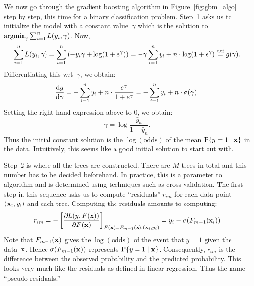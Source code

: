 We now go through the gradient boosting algorithm in Figure~\ref{fig:gbm_algo} 
step by step, this time for a binary classification problem. 
Step~1 asks us to initialize the model with a constant value~$\gamma$ which 
is the solution to $\operatorname{argmin}_{\gamma} \sum_{i = 1}^{n} L(y_i, \gamma)$. Now, 
\begin{equation}
    \sum_{i =1}^{n} L(y_i, \gamma) 
        = \sum_{i = 1}^n \left ( -y_i \gamma + \log (1 + e^{\gamma}) \right )
        = - \gamma \sum_{i = 1}^{n} y_i + n \cdot \log (1 + e^{\gamma}) 
        \stackrel{\text{def}}{=} g(\gamma).
\end{equation}
Differentiating this wrt~$\gamma$, we obtain:
\begin{equation}
    \frac{\mathrm{d} g}{\mathrm{d} \gamma} = - \sum_{i = 1}^n y_i + n \cdot \frac{e^{\gamma}}{1 + e^{\gamma}} 
        = - \sum_{i = 1}^n y_i + n \cdot \sigma(\gamma).  
\end{equation}
Setting the right hand expression above to $0$, we obtain:
\begin{equation}
    \gamma = \log \frac{\bar{y}_n}{1 - \bar{y}_n}.
\end{equation}
Thus the initial constant solution is the $\log (\text{odds})$ of the mean 
$\operatorname{P} \{y = 1 \mid \mathbf{x} \}$ in the data. Intuitively, this seems like a good 
initial solution to start out with.

Step~2 is where all the trees are constructed. There are $M$ trees in total and 
this number has to be decided beforehand. In practice, this is a parameter to 
algorithm and is determined using techniques such as cross-validation. The first 
step in this sequence asks us to compute ``residuals'' $r_{i m}$ for each data 
point $(\mathbf{x}_i, y_i)$ and each tree. Computing the residuals amounts 
to computing:
\begin{equation}
    r_{i m} = - \left [ 
                        \frac{\partial L(y, F(\mathbf{x}))}{\partial F(\mathbf{x})} 
                \right ]_{F(\mathbf{x}) = F_{m - 1}(\mathbf{x}), (\mathbf{x}_i, y_i)}
            = y_i - \sigma(F_{m - 1}(\mathbf{x}_i))
\end{equation}  
Note that $F_{m - 1}(\mathbf{x})$ gives the $\log (\text{odds})$ of the event that 
$y = 1$ given the data~$\mathbf{x}$. Hence $\sigma(F_{m - 1}(\mathbf{x}))$ represents 
$\operatorname{P} \{y = 1 \mid \mathbf{x} \}$. Consequently, $r_{im}$ is the difference between 
the observed probability and the predicted probability. This looks very much 
like the residuals as defined in linear regression. Thus the name ``pseudo residuals.''

